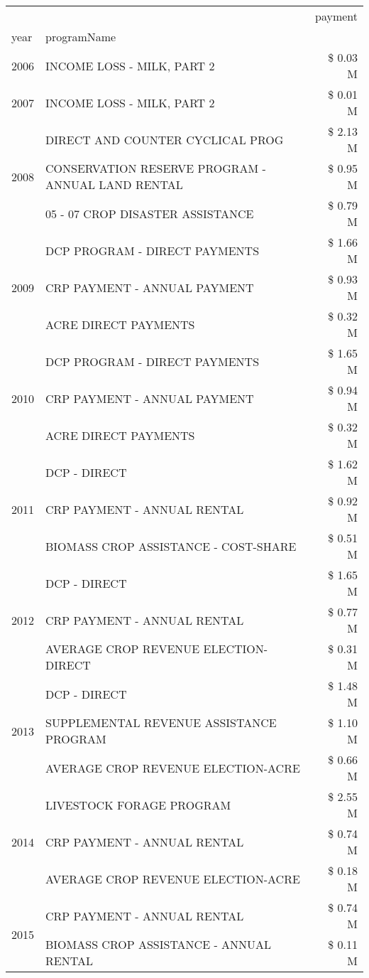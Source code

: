 \begin{tabular}{llr}
\toprule
 &  & payment \\
year & programName &  \\
\midrule
2006 & INCOME LOSS - MILK, PART 2 & \$ 0.03 M \\
\cline{1-3}
2007 & INCOME LOSS - MILK, PART 2 & \$ 0.01 M \\
\cline{1-3}
\multirow[t]{3}{*}{2008} & DIRECT AND COUNTER CYCLICAL PROG & \$ 2.13 M \\
 & CONSERVATION RESERVE PROGRAM - ANNUAL LAND RENTAL & \$ 0.95 M \\
 & 05 - 07 CROP DISASTER ASSISTANCE & \$ 0.79 M \\
\cline{1-3}
\multirow[t]{3}{*}{2009} & DCP PROGRAM - DIRECT PAYMENTS & \$ 1.66 M \\
 & CRP PAYMENT - ANNUAL PAYMENT & \$ 0.93 M \\
 & ACRE DIRECT PAYMENTS & \$ 0.32 M \\
\cline{1-3}
\multirow[t]{3}{*}{2010} & DCP PROGRAM - DIRECT PAYMENTS & \$ 1.65 M \\
 & CRP PAYMENT - ANNUAL PAYMENT & \$ 0.94 M \\
 & ACRE DIRECT PAYMENTS & \$ 0.32 M \\
\cline{1-3}
\multirow[t]{3}{*}{2011} & DCP - DIRECT & \$ 1.62 M \\
 & CRP PAYMENT - ANNUAL RENTAL & \$ 0.92 M \\
 & BIOMASS CROP ASSISTANCE - COST-SHARE & \$ 0.51 M \\
\cline{1-3}
\multirow[t]{3}{*}{2012} & DCP - DIRECT & \$ 1.65 M \\
 & CRP PAYMENT - ANNUAL RENTAL & \$ 0.77 M \\
 & AVERAGE CROP REVENUE ELECTION-DIRECT & \$ 0.31 M \\
\cline{1-3}
\multirow[t]{3}{*}{2013} & DCP - DIRECT & \$ 1.48 M \\
 & SUPPLEMENTAL REVENUE ASSISTANCE PROGRAM & \$ 1.10 M \\
 & AVERAGE CROP REVENUE ELECTION-ACRE & \$ 0.66 M \\
\cline{1-3}
\multirow[t]{3}{*}{2014} & LIVESTOCK FORAGE PROGRAM & \$ 2.55 M \\
 & CRP PAYMENT - ANNUAL RENTAL & \$ 0.74 M \\
 & AVERAGE CROP REVENUE ELECTION-ACRE & \$ 0.18 M \\
\cline{1-3}
\multirow[t]{3}{*}{2015} & CRP PAYMENT - ANNUAL RENTAL & \$ 0.74 M \\
 & BIOMASS CROP ASSISTANCE - ANNUAL RENTAL & \$ 0.11 M \\

\end{tabular}
